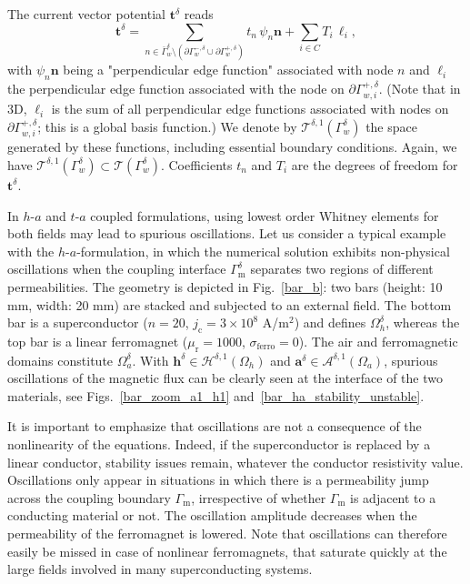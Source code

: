 \documentclass[journal]{IEEEtran}
\renewcommand{\vec}[1]{\boldsymbol{#1}} %
\newcommand{\n}{\vec n}
\newcommand{\jc}{j_{\text{c}}}
\newcommand{\Oa}{\Omega_a}
\newcommand{\Oh}{\Omega_h}
\newcommand{\Gm}{\Gamma_\text{m}}
\newcommand{\hafOnly}{$h$-$a$-formulation}
\newcommand{\Oad}{\Omega_a^\delta}
\newcommand{\Ohd}{\Omega_h^\delta}
\newcommand{\Gmd}{\Gamma_\text{m}^\delta}
\newcommand{\Gwd}{\Gamma_w^\delta}
\newcommand{\GGwmd}{\partial\Gamma_w^{-,\delta}}
\newcommand{\GGwpd}{\partial\Gamma_w^{+,\delta}}
\newcommand{\GGwpid}{\partial\Gamma_{w,i}^{+,\delta}}
\newcommand{\Gwdb}{\bar{\Gamma}_w^\delta}
\newcommand{\tsp}{\mathcal{T}}
\newcommand{\hspdone}{\mathcal{H}^{\delta,1}}
\newcommand{\aspdone}{\mathcal{A}^{\delta,1}}
\newcommand{\tspdone}{\mathcal{T}^{\delta,1}}
\newcommand{\ad}{\vec a^{\delta}}
\newcommand{\td}{\vec t^{\delta}}
\newcommand{\hd}{\vec h^{\delta}}
\begin{document}
The current vector potential $\td$ reads
\begin{equation}\label{eqn_t_decomposition}
\td = \sum_{n\in \Gwdb\setminus (\GGwmd \cup \GGwpd)} t_n\, \psi_n\n + \sum_{i\in C} T_i\, \vec \ell_i,
\end{equation}
with $\psi_n \n$ being a "perpendicular edge function" associated with node $n$ and $\vec \ell_i$ the perpendicular edge function associated with the node on $\GGwpid$. (Note that in 3D, $\vec \ell_i$ is the sum of all perpendicular edge functions associated with nodes on $\GGwpid$; this is a global basis function.) We denote by $\tspdone(\Gwd)$ the space generated by these functions, including essential boundary conditions. Again, we have $\tspdone(\Gwd)\subset \tsp(\Gwd)$. Coefficients $t_n$ and $T_i$ are the degrees of freedom for $\td$.

In $h$-$a$ and $t$-$a$ coupled formulations, using lowest order Whitney elements for both fields may lead to spurious oscillations. Let us consider a typical example with the \hafOnly, in which the numerical solution exhibits non-physical oscillations when the coupling interface $\Gmd$ separates two regions of different permeabilities. The geometry is depicted in Fig.~\ref{bar_b}: two bars (height: 10 mm, width: 20 mm) are stacked and subjected to an external field. The bottom bar is a superconductor ($n=20$, $\jc=3\times 10^8$ A/m$^2$) and defines $\Ohd$, whereas the top bar is a linear ferromagnet ($\mu_\text{r} = 1000$, $\sigma_\text{ferro} = 0$). The air and ferromagnetic domains constitute $\Oad$. With $\hd\in \hspdone(\Oh)$ and $\ad\in \aspdone(\Oa)$, spurious oscillations of the magnetic flux can be clearly seen at the interface of the two materials, see Figs.~\ref{bar_zoom_a1_h1} and~\ref{bar_ha_stability_unstable}.

It is important to emphasize that oscillations are not a consequence of the nonlinearity of the equations. Indeed, if the superconductor is replaced by a linear conductor, stability issues remain, whatever the conductor resistivity value. Oscillations only appear in situations in which there is a permeability jump across the coupling boundary $\Gm$, irrespective of whether $\Gm$ is adjacent to a conducting material or not. The oscillation amplitude decreases when the permeability of the ferromagnet is lowered. Note that oscillations can therefore easily be missed in case of nonlinear ferromagnets, that saturate quickly at the large fields involved in many superconducting systems.
\end{document}
